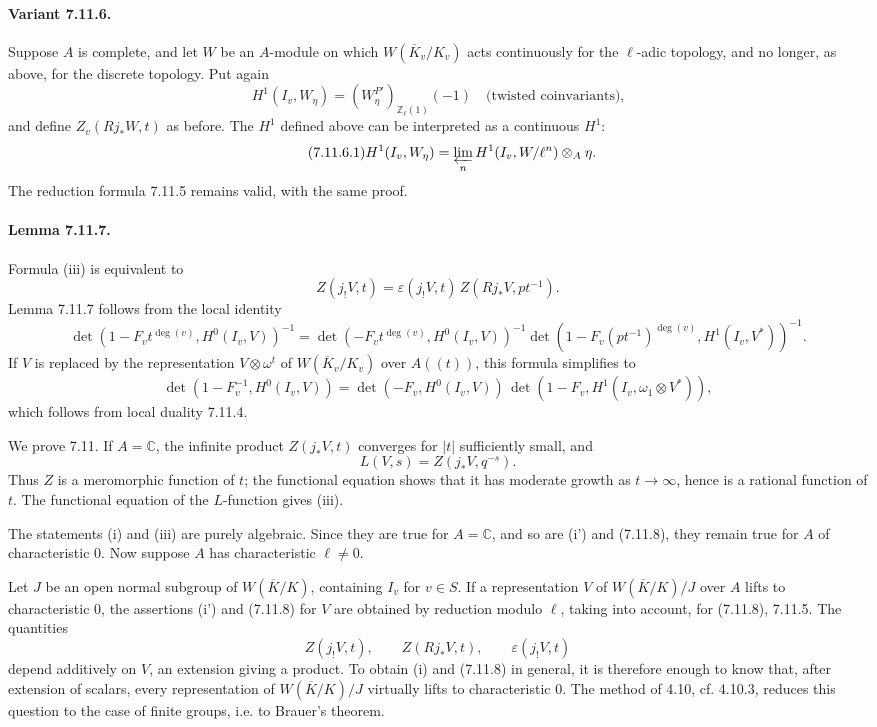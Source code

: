 \documentclass[10pt]{article}
\newcommand{\C}{\mathbb C}
\begin{document}
\paragraph{Variant 7.11.6.} Suppose \(A\) is complete, and let \(W\) be an \(A\)-module on which \(W(\overline K_v/K_v)\) acts continuously for the \(\ell\)-adic topology, and no longer, as above, for the discrete topology. Put again
\[
H^1(I_v,W_\eta)=(W_\eta^{P'})_{\mathbb Z_\ell(1)}(-1)
\quad\text{(twisted coinvariants),}
\]
and define \(Z_v(Rj_*W,t)\) as before. The \(H^1\) defined above can be interpreted as a continuous \(H^1\):
\[
\tag{7.11.6.1}
H^1(I_v,W_\eta)=
\varprojlim_n H^1(I_v,W/\ell^n)\otimes_A\eta.
\]
The reduction formula 7.11.5 remains valid, with the same proof.

\paragraph{Lemma 7.11.7.} Formula (iii) is equivalent to
\[
\tag{7.11.8}
Z(j_!V,t)=\varepsilon(j_!V,t)\,Z(Rj_*V,pt^{-1}).
\]
Lemma 7.11.7 follows from the local identity
\[
\det(1-F_vt^{\deg(v)},H^0(I_v,V))^{-1}
=
\det(-F_vt^{\deg(v)},H^0(I_v,V))^{-1}
\det(1-F_v(pt^{-1})^{\deg(v)},H^1(I_v,V^*))^{-1}.
\]
If \(V\) is replaced by the representation \(V\otimes\omega^t\) of \(W(\overline K_v/K_v)\) over \(A((t))\), this formula simplifies to
\[
\det(1-F_v^{-1},H^0(I_v,V))
=
\det(-F_v,H^0(I_v,V))\,
\det(1-F_v,H^1(I_v,\omega_1\otimes V^*)),
\]
which follows from local duality 7.11.4.

We prove 7.11. If \(A=\C\), the infinite product \(Z(j_*V,t)\) converges for \(|t|\) sufficiently small, and
\[
L(V,s)=Z(j_*V,q^{-s}).
\]
Thus \(Z\) is a meromorphic function of \(t\); the functional equation shows that it has moderate growth as \(t\to\infty\), hence is a rational function of \(t\). The functional equation of the \(L\)-function gives (iii).

The statements (i) and (iii) are purely algebraic. Since they are true for \(A=\C\), and so are (i') and (7.11.8), they remain true for \(A\) of characteristic \(0\). Now suppose \(A\) has characteristic \(\ell\ne0\).

Let \(J\) be an open normal subgroup of \(W(\overline K/K)\), containing \(I_v\) for \(v\in S\). If a representation \(V\) of \(W(\overline K/K)/J\) over \(A\) lifts to characteristic \(0\), the assertions (i') and (7.11.8) for \(V\) are obtained by reduction modulo \(\ell\), taking into account, for (7.11.8), 7.11.5. The quantities
\[
Z(j_!V,t),\qquad Z(Rj_*V,t),\qquad \varepsilon(j_!V,t)
\]
depend additively on \(V\), an extension giving a product. To obtain (i) and (7.11.8) in general, it is therefore enough to know that, after extension of scalars, every representation of \(W(\overline K/K)/J\) virtually lifts to characteristic \(0\). The method of 4.10, cf. 4.10.3, reduces this question to the case of finite groups, i.e. to Brauer's theorem.
\end{document}
